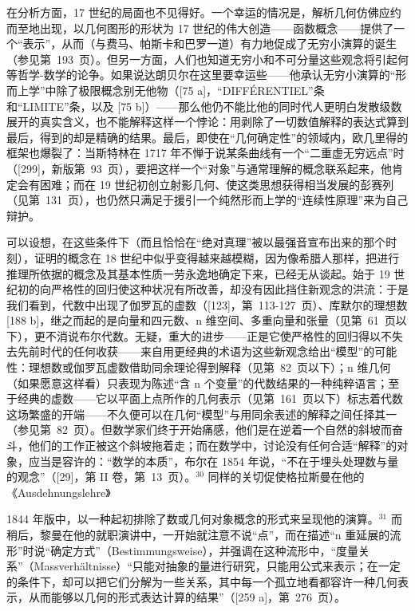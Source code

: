 在分析方面，17 世纪的局面也不见得好。一个幸运的情况是，解析几何仿佛应约而至地出现，以几何图形的形状为 17 世纪的伟大创造——函数概念——提供了一个“表示”，从而（与费马、帕斯卡和巴罗一道）有力地促成了无穷小演算的诞生（参见第~193~页）。但另一方面，人们也知道无穷小和不可分量这些观念将引起何等哲学-数学的论争。如果说达朗贝尔在这里要幸运些——他承认无穷小演算的“形而上学”中除了极限概念别无他物（{[}75 a{]}，“DIFFÉRENTIEL”条和“LIMITE”条，以及 {[}75 b{]}）——那么他仍不能比他的同时代人更明白发散级数展开的真实含义，也不能解释这样一个悖论：用剥除了一切数值解释的表达式算到最后，得到的却是精确的结果。最后，即使在“几何确定性”的领域内，欧几里得的框架也爆裂了：当斯特林在 1717 年不惮于说某条曲线有一个“二重虚无穷远点”时（{[}299{]}，新版第~93~页），要把这样一个“对象”与通常理解的概念联系起来，他肯定会有困难；而在 19 世纪初创立射影几何、使这类思想获得相当发展的彭赛列（见第~131~页），也仍然只满足于援引一个纯然形而上学的“连续性原理”来为自己辩护。

可以设想，在这些条件下（而且恰恰在“绝对真理”被以最强音宣布出来的那个时刻），证明的概念在 18 世纪中似乎变得越来越模糊，因为像希腊人那样，把进行推理所依据的概念及其基本性质一劳永逸地确定下来，已经无从谈起。始于 19 世纪初的向严格性的回归使这种状况有所改善，却没有因此挡住新观念的洪流：于是我们看到，代数中出现了伽罗瓦的虚数（{[}123{]}，第~113-127~页）、库默尔的理想数 {[}188 b{]}，继之而起的是向量和四元数、n 维空间、多重向量和张量（见第~61~页以下），更不消说布尔代数。无疑，重大的进步——正是它使严格性的回归得以不失去先前时代的任何收获——来自用更经典的术语为这些新观念给出“模型”的可能性：理想数或伽罗瓦虚数借助同余理论得到解释（见第~82~页以下）；n 维几何（如果愿意这样看）只表现为陈述“含 n 个变量”的代数结果的一种纯粹语言；至于经典的虚数——它以平面上点所作的几何表示（见第~161~页以下）标志着代数这场繁盛的开端——不久便可以在几何“模型”与用同余表述的解释之间任择其一（参见第~82~页）。但数学家们终于开始痛感，他们是在逆着一个自然的斜坡而奋斗，他们的工作正被这个斜坡拖着走；而在数学中，讨论没有任何合适“解释”的对象，应当是容许的：“数学的本质”，布尔在 1854 年说，“不在于埋头处理数与量的观念”（{[}29{]}，第 II 卷，第~13~页）。\(^{30}\) 同样的关切促使格拉斯曼在他的《Ausdehnungslehre》

1844 年版中，以一种起初排除了数或几何对象概念的形式来呈现他的演算。\(^{31}\) 而稍后，黎曼在他的就职演讲中，一开始就注意不说“点”，而在描述“n 重延展的流形”时说“确定方式”（Bestimmungsweise），并强调在这种流形中，“度量关系”（Massverhältnisse）“只能对抽象的量进行研究，只能用公式来表示；在一定的条件下，却可以把它们分解为一些关系，其中每一个孤立地看都容许一种几何表示，从而能够以几何的形式表达计算的结果”（{[}259 a{]}，第~276~页）。

